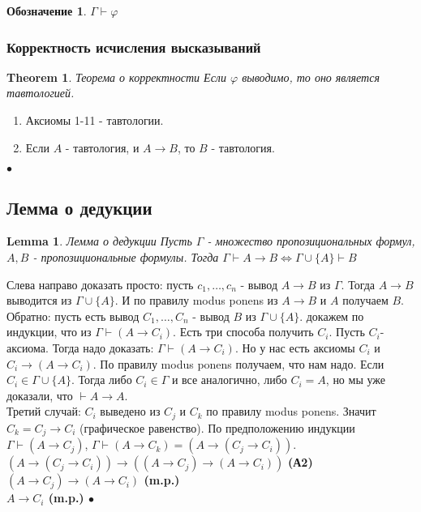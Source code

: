 \documentclass[a4paper]{article}
\theoremstyle{plain}
\newtheorem{theorem}{Theorem}
\newtheorem{lem}{Lemma}
\theoremstyle{remark}
\theoremstyle{definition}
\newtheorem*{designation}{Обозначение}
\renewenvironment{proof}{{\bfseries Proof}}{$\bullet$}
\begin{document}
\begin{designation}
	$\Gamma \vdash \varphi$
\end{designation}
\subsubsection{Корректность исчисления высказываний}
\begin{theorem}{Теорема о корректности}
	Если $\varphi$ выводимо, то оно является тавтологией.
\end{theorem}

\begin{proof}
\begin{enumerate}
	\item Аксиомы 1-11 - тавтологии.\\
	\item Если $A$ - тавтология, и $A\rightarrow B$, то $B$ - тавтология.
\end{enumerate}
\end{proof}


\subsection{Лемма о дедукции}
\begin{lem}{Лемма о дедукции}
	\newline
	Пусть $\Gamma$ - множество пропозициональных формул, $A,B$ - пропозициональные формулы. Тогда $\Gamma \vdash A \rightarrow B \Leftrightarrow \Gamma \cup \{A\} \vdash B$
\end{lem}

\begin{proof}
	Слева направо доказать просто: пусть $c_1, \ldots, c_n$ - вывод $A \rightarrow B$ из $\Gamma$. Тогда $A\rightarrow B$ выводится из $\Gamma \cup \{A\}$. И по правилу modus ponens из $A \rightarrow B$ и $A$ получаем $B$. \\
	Обратно: пусть есть вывод $C_1, \ldots, C_n$ - вывод $B$ из $\Gamma \cup \{A\}$. докажем по индукции, что из $\Gamma \vdash (A \rightarrow C_i)$. Есть три способа получить $C_i$. Пусть $C_i$- аксиома. Тогда надо доказать: $\Gamma \vdash (A \rightarrow C_i)$. Но у нас есть аксиомы $C_i$ и $C_i \rightarrow (A \rightarrow C_i)$. По правилу modus ponens получаем, что нам надо. Если $C_i \in \Gamma \cup \{A\}$. Тогда либо $C_i \in \Gamma$ и все аналогично, либо $C_i = A$, но мы уже доказали, что $\vdash A \rightarrow A$.	\\
	Третий случай: $C_i$ выведено из $C_j$ и $C_k$ по правилу modus ponens. Значит $C_k = C_j \rightarrow C_i$ (графическое равенство). По предположению индукции $\Gamma \vdash (A \rightarrow C_j)$, $\Gamma \vdash (A \rightarrow C_k) = (A \rightarrow (C_j \rightarrow C_i))$. \\
	$(A \rightarrow(C_j \rightarrow C_i)) \rightarrow ((A \rightarrow C_j) \rightarrow (A \rightarrow C_i))$ \bf{(А2)} \\
	$(A \rightarrow C_j) \rightarrow (A \rightarrow C_i)$ \bf{(m.p.)} \\
	$A \rightarrow C_i$ \bf{(m.p.)}
\end{proof}
\end{document}
